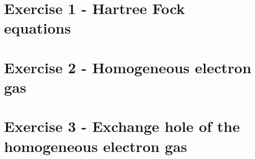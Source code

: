 








\section{Exercise 1 - Hartree Fock equations}

\section{Exercise 2 - Homogeneous electron gas}

\section{Exercise 3 - Exchange hole of the homogeneous electron gas}


